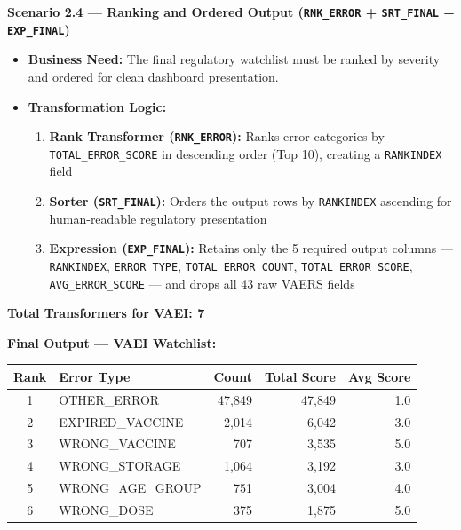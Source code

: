\documentclass[12pt,a4paper]{report}
\begin{document}
\bigskip

\noindent\textbf{Scenario 2.4 — Ranking and Ordered Output (\texttt{RNK\_ERROR} + \texttt{SRT\_FINAL} + \texttt{EXP\_FINAL})}

\begin{itemize}[leftmargin=*]
  \item \textbf{Business Need:} The final regulatory watchlist must be ranked by severity and ordered for clean dashboard presentation.
  \item \textbf{Transformation Logic:}
    \begin{enumerate}[leftmargin=*]
      \item \textbf{Rank Transformer (\texttt{RNK\_ERROR}):} Ranks error categories by \texttt{TOTAL\_ERROR\_SCORE} in descending order (Top 10), creating a \texttt{RANKINDEX} field
      \item \textbf{Sorter (\texttt{SRT\_FINAL}):} Orders the output rows by \texttt{RANKINDEX} ascending for human-readable regulatory presentation
      \item \textbf{Expression (\texttt{EXP\_FINAL}):} Retains only the 5 required output columns — \texttt{RANKINDEX}, \texttt{ERROR\_TYPE}, \texttt{TOTAL\_ERROR\_COUNT}, \texttt{TOTAL\_ERROR\_SCORE}, \texttt{AVG\_ERROR\_SCORE} — and drops all 43 raw VAERS fields
    \end{enumerate}
\end{itemize}

\textbf{Total Transformers for VAEI: 7}

\bigskip
\noindent\textbf{Final Output — VAEI Watchlist:}

\begin{center}
\begin{tabular}{clrrr}
\toprule
\textbf{Rank} & \textbf{Error Type}    & \textbf{Count}  & \textbf{Total Score} & \textbf{Avg Score} \\
\midrule
1 & OTHER\_ERROR      & 47,849 & 47,849 & 1.0 \\
2 & EXPIRED\_VACCINE  &  2,014 &  6,042 & 3.0 \\
3 & WRONG\_VACCINE    &    707 &  3,535 & 5.0 \\
4 & WRONG\_STORAGE    &  1,064 &  3,192 & 3.0 \\
5 & WRONG\_AGE\_GROUP &    751 &  3,004 & 4.0 \\
6 & WRONG\_DOSE       &    375 &  1,875 & 5.0 \\
\bottomrule
\end{tabular}
\end{center}
\end{document}
